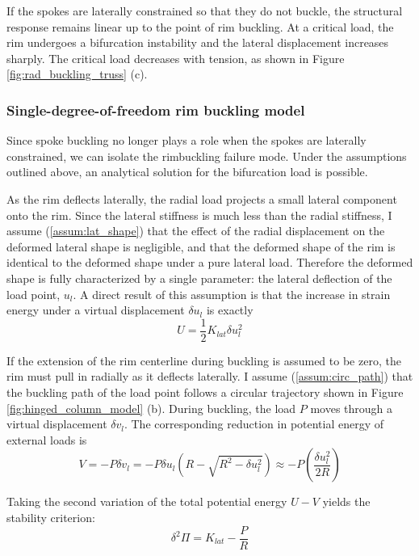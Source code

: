 \documentclass[\rootdir/thesis.tex]{subfiles}
\begin{document}
If the spokes are laterally constrained so that they do not buckle, the structural response remains linear up to the point of rim buckling. At a critical load, the rim undergoes a bifurcation instability and the lateral displacement increases sharply. The critical load decreases with tension, as shown in Figure \ref{fig:rad_buckling_truss} (c).

\subsubsection{Single-degree-of-freedom rim buckling model}

Since spoke buckling no longer plays a role when the spokes are laterally constrained, we can isolate the rimbuckling failure mode. Under the assumptions outlined above, an analytical solution for the bifurcation load is possible.

As the rim deflects laterally, the radial load projects a small lateral component onto the rim. Since the lateral stiffness is much less than the radial stiffness, I assume (\ref{assum:lat_shape}) that the effect of the radial displacement on the deformed lateral shape is negligible, and that the deformed shape of the rim is identical to the deformed shape under a pure lateral load. Therefore the deformed shape is fully characterized by a single parameter: the lateral deflection of the load point, $u_l$. A direct result of this assumption is that the increase in strain energy under a virtual displacement $\delta u_l$ is exactly
\begin{equation}
\label{eq:U_rim_1dof}
U = \frac{1}{2}K_{lat}\delta u_l^2
\end{equation}

If the extension of the rim centerline during buckling is assumed to be zero, the rim must pull in radially as it deflects laterally. I assume (\ref{assum:circ_path}) that the buckling path of the load point follows a circular trajectory shown in Figure \ref{fig:hinged_column_model} (b). During buckling, the load $P$ moves through a virtual displacement $\delta v_l$. The corresponding reduction in potential energy of external loads is
\begin{equation}
\label{eq:V_rim_1dof}
V = -P\delta v_l = -P \delta u_l \left(R - \sqrt{R^2 - \delta u_l^2}\right)
\approx -P \left(\frac{\delta u_l^2}{2R}\right)
\end{equation}

Taking the second variation of the total potential energy $U-V$ yields the stability criterion:
\begin{equation}
\label{eq:ddPi_1dof}
\delta^2 \Pi = K_{lat} - \frac{P}{R}
\end{equation}
\end{document}

